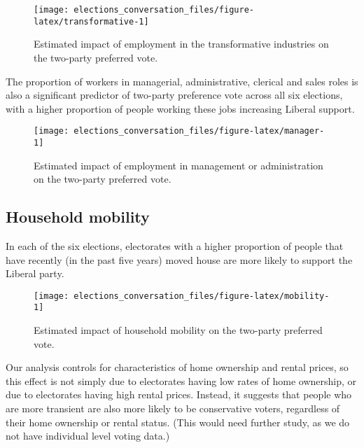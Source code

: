 \documentclass[11pt,a4paper,]{article}
\begin{document}
\begin{figure}[H]

{\centering \texttt{[image: elections\_conversation\_files/figure-latex/transformative-1]} 

}

\caption{Estimated impact of employment in the transformative industries on the two-party preferred vote.}\label{fig:transformative}
\end{figure}

The proportion of workers in managerial, administrative, clerical and sales roles is also a significant predictor of two-party preference vote across all six elections, with a higher proportion of people working these jobs increasing Liberal support.

\begin{figure}[H]

{\centering \texttt{[image: elections\_conversation\_files/figure-latex/manager-1]} 

}

\caption{Estimated impact of employment in management or administration on the two-party preferred vote.}\label{fig:manager}
\end{figure}

\hypertarget{household-mobility}{%
\subsection*{Household mobility}\label{household-mobility}}

In each of the six elections, electorates with a higher proportion of people that have recently (in the past five years) moved house are more likely to support the Liberal party.

\begin{figure}[H]

{\centering \texttt{[image: elections\_conversation\_files/figure-latex/mobility-1]} 

}

\caption{Estimated impact of household mobility on the two-party preferred vote.}\label{fig:mobility}
\end{figure}

Our analysis controls for characteristics of home ownership and rental prices, so this effect is not simply due to electorates having low rates of home ownership, or due to electorates having high rental prices. Instead, it suggests that people who are more transient are also more likely to be conservative voters, regardless of their home ownership or rental status. (This would need further study, as we do not have individual level voting data.)
\end{document}
